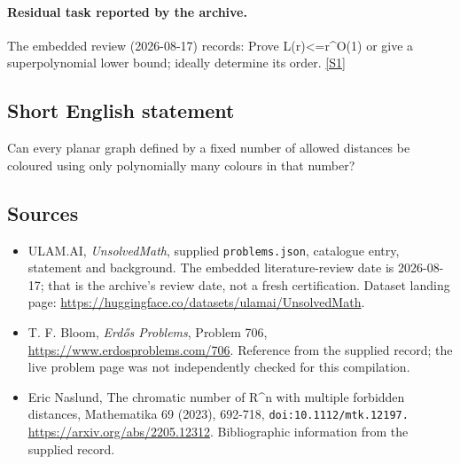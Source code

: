 \documentclass[11pt,a4paper]{article}
\newcommand{\sref}[2]{\hyperlink{source:#1:#2}{[S#2]}}
\begin{document}
\paragraph{Residual task reported by the archive.}

The embedded review (2026-08-17) records: Prove L(r)<=r\textasciicircum{}{O(1)} or give a superpolynomial lower bound; ideally determine its order. \sref{statement}{1}

\subsection{Short English statement}

Can every planar graph defined by a fixed number of allowed distances be coloured using only polynomially many colours in that number?

\subsection{Sources}

{\small

\begin{itemize}

\item[\hypertarget{source:statement:1}{S1}] ULAM.AI, \emph{UnsolvedMath}, supplied \texttt{problems.json}, catalogue entry, statement and background. The embedded literature-review date is 2026-08-17; that is the archive’s review date, not a fresh certification. Dataset landing page: \url{https://huggingface.co/datasets/ulamai/UnsolvedMath}.

\item[\hypertarget{source:statement:2}{S2}] T. F. Bloom, \emph{Erdős Problems}, Problem 706, \url{https://www.erdosproblems.com/706}. Reference from the supplied record; the live problem page was not independently checked for this compilation.

\item[\hypertarget{source:statement:3}{S3}] Eric Naslund, The chromatic number of R\textasciicircum{}n with multiple forbidden distances, Mathematika 69 (2023), 692-718, \nolinkurl{doi:10.1112/mtk.12197.} \url{https://arxiv.org/abs/2205.12312}. Bibliographic information from the supplied record.

\end{itemize}

}

\label{end:statement}
\end{document}
